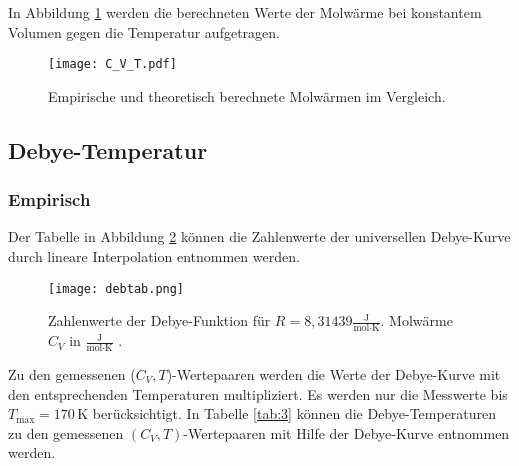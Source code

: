 In Abbildung \ref{C_V} werden die berechneten Werte der Molwärme bei konstantem Volumen gegen die Temperatur aufgetragen.

\begin{figure}[H]
  \centering
  \texttt{[image: C\_V\_T.pdf]}
  \caption{Empirische und theoretisch berechnete Molwärmen im Vergleich.}
  \label{C_V}
\end{figure}

\subsection{Debye-Temperatur}
\subsubsection{Empirisch}

Der Tabelle in Abbildung \ref{debfkt} können die Zahlenwerte der universellen Debye-Kurve durch lineare Interpolation entnommen werden.

\begin{figure}[H]
  \centering
  \texttt{[image: debtab.png]}
  \caption{Zahlenwerte der Debye-Funktion für $R = 8,31439\frac{\text{J}}{\text{mol}\cdot\text{K}}$. Molwärme $C_V$ in $\frac{\text{J}}{\text{mol}\cdot\text{K}}$ \cite{skript}.}
  \label{debfkt}
\end{figure}

Zu den gemessenen ($C_V,T$)-Wertepaaren werden die Werte der Debye-Kurve mit den entsprechenden Temperaturen multipliziert.
Es werden nur die Messwerte bis $T_{\text{max}} = 170$\,K berücksichtigt.
In Tabelle \ref{tab:3} können die Debye-Temperaturen zu den gemessenen $(C_V,T)$-Wertepaaren mit Hilfe der Debye-Kurve entnommen werden.

